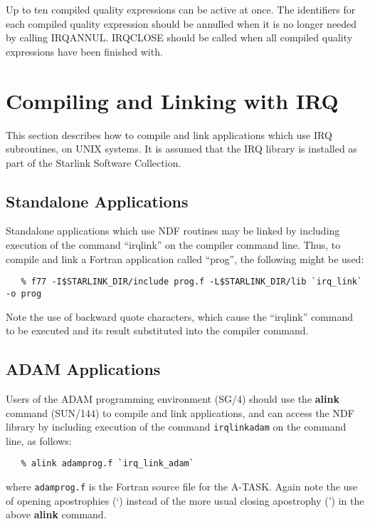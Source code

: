 \documentclass[twoside,11pt]{article}
\newcommand{\htmlref}[2]{#1}
\newcommand{\latex}[1]{#1}
\newcommand{\xref}[3]{#1}
\renewcommand{\_}{\texttt{\symbol{95}}}
\begin{document}
Up to ten compiled quality expressions can be active at once. The
identifiers for each compiled quality expression should be annulled
when it is no longer needed by calling
\htmlref{IRQ\_ANNUL}{IRQ_ANNUL}. \htmlref{IRQ\_CLOSE}{IRQ_CLOSE}
should be called when all compiled quality expressions have been
finished with. 

\section {Compiling and Linking with IRQ}
\label{SEC:LINK}
This section describes how to compile and link applications which use IRQ
subroutines, on UNIX systems. It is assumed that the IRQ library
is installed as part of the Starlink Software Collection.


\subsection{Standalone Applications}
Standalone applications which use NDF\_ routines may be linked by
including execution of the command ``irq\_link'' on the compiler
command line. Thus, to compile and link a Fortran application called
``prog'', the following might be used:

\small
\begin{verbatim}
   % f77 -I$STARLINK_DIR/include prog.f -L$STARLINK_DIR/lib `irq_link` -o prog
\end{verbatim}
\normalsize

Note the use of backward quote characters, which cause the
``irq\_link'' command to be executed and its result substituted into
the compiler command.

\subsection{\label{ss:buildingadamapplications}ADAM Applications}
Users of the \xref{ADAM}{sg4}{} programming environment
\latex{(SG/4)} should use
the \xref{{\bf alink}}{sun144}{ADAM_link_scripts} command
(\xref{SUN/144}{sun144}{}) to compile and link applications, and can
access the NDF\_ library by including execution of the command
{\tt irq\_link\_adam} on the command line, as follows:

\small
\begin{verbatim}
   % alink adamprog.f `irq_link_adam`
\end{verbatim}
\normalsize

where {\tt adamprog.f} is the Fortran source file for the A-TASK. Again
note the use of opening apostrophies (`) instead of the more usual
closing apostrophy (') in the above {\bf alink} command.
\end{document}
